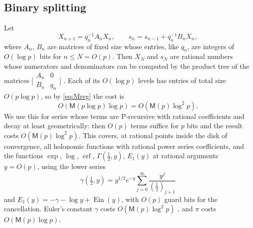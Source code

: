 \documentclass[11pt]{amsart}
\theoremstyle{definition}
\theoremstyle{remark}
\newcommand{\Ein}{\operatorname{Ein}}
\newcommand{\erf}{\operatorname{erf}}
\newcommand{\Mul}{\mathsf{M}}
\begin{document}
\subsection{Binary splitting}\label{sec:bsplit}
Let
\[
  X_{n+1} = q_n^{-1} A_n X_n, \qquad s_{n} = s_{n-1} + q_n^{-1} B_n X_n,
\]
where $A_n$, $B_n$ are matrices of fixed size whose entries, like $q_n$, are integers of $O(\log p)$ bits for
$n \le N = O(p)$. Then $X_N$ and $s_N$ are rational numbers whose numerators and denominators can be computed by
the product tree of the matrices $\bigl[\begin{smallmatrix} A_n & 0 \\ B_n & q_n\end{smallmatrix}\bigr]$
\cite{HP98}. Each of its $O(\log p)$ levels has entries of total size $O(p\log p)$, so by \eqref{eq:Mreg} the cost is
\[
  O(\Mul(p\log p)\log p) = O(\Mul(p)\log^2 p).
\] We
use this for series whose terms are P-recursive with rational coefficients and decay at least
geometrically: then $O(p)$ terms suffice for $p$ bits and the result costs $O(\Mul(p) \log^2 p)$.
This covers, at rational points inside the disk of convergence, all holonomic functions with rational
power series coefficients, and the functions $\exp$, $\log$, $\erf$, $\Gamma(\frac12, y)$, $E_1(y)$
at rational arguments $y = O(p)$, using the lower series
\[
  \gamma(\tfrac12,y) = y^{1/2}e^{-y}\sum_{j=0}^{\infty} \frac{y^j}{(\frac12)_{j+1}}
\]
and $E_1(y) = -\gamma - \log y + \Ein(y)$, with $O(p)$ guard bits for the cancellation. Euler's constant $\gamma$
costs $O(\Mul(p)\log^2p)$ \cite{BM80}, and $\pi$ costs $O(\Mul(p)\log p)$.
\end{document}
